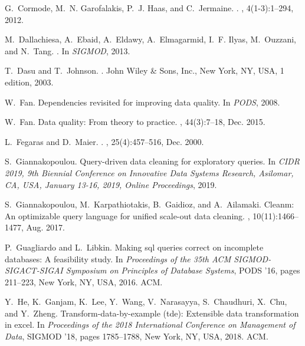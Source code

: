 G.~Cormode, M.~N. Garofalakis, P.~J. Haas, and C.~Jermaine.
.
, 4(1-3):1--294, 2012.

M.~Dallachiesa, A.~Ebaid, A.~Eldawy, A.~Elmagarmid, I.~F. Ilyas, M.~Ouzzani,
  and N.~Tang.
.
\newblock In {\em {SIGMOD}}, 2013.

T.~Dasu and T.~Johnson.
.
\newblock John Wiley \& Sons, Inc., New York, NY, USA, 1 edition, 2003.

W.~Fan.
\newblock Dependencies revisited for improving data quality.
\newblock In {\em {PODS}}, 2008.

W.~Fan.
\newblock Data quality: From theory to practice.
, 44(3):7--18, Dec. 2015.

L.~Fegaras and D.~Maier.
.
, 25(4):457--516, Dec. 2000.

S.~Giannakopoulou.
\newblock Query-driven data cleaning for exploratory queries.
\newblock In {\em {CIDR} 2019, 9th Biennial Conference on Innovative Data
  Systems Research, Asilomar, CA, USA, January 13-16, 2019, Online
  Proceedings}, 2019.

S.~Giannakopoulou, M.~Karpathiotakis, B.~Gaidioz, and A.~Ailamaki.
\newblock Cleanm: An optimizable query language for unified scale-out data
  cleaning.
, 10(11):1466--1477, Aug. 2017.

P.~Guagliardo and L.~Libkin.
\newblock Making sql queries correct on incomplete databases: A feasibility
  study.
\newblock In {\em Proceedings of the 35th ACM SIGMOD-SIGACT-SIGAI Symposium on
  Principles of Database Systems}, PODS '16, pages 211--223, New York, NY, USA,
  2016. ACM.

Y.~He, K.~Ganjam, K.~Lee, Y.~Wang, V.~Narasayya, S.~Chaudhuri, X.~Chu, and
  Y.~Zheng.
\newblock Transform-data-by-example (tde): Extensible data transformation in
  excel.
\newblock In {\em Proceedings of the 2018 International Conference on
  Management of Data}, SIGMOD '18, pages 1785--1788, New York, NY, USA, 2018.
  ACM.

